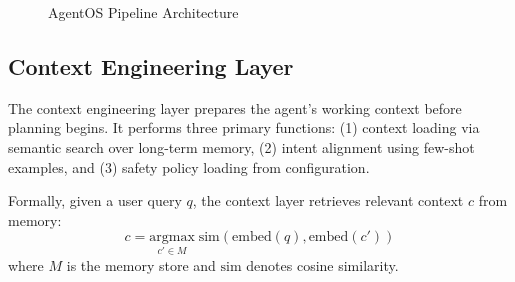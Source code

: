 \documentclass[11pt,a4paper]{article}
\begin{document}
\begin{figure}[htbp]
\centering
{}
\caption{AgentOS Pipeline Architecture}
\label{fig:architecture}
\end{figure}

\subsection{Context Engineering Layer}

The context engineering layer prepares the agent's working context before planning begins. It performs three primary functions: (1) context loading via semantic search over long-term memory, (2) intent alignment using few-shot examples, and (3) safety policy loading from configuration.

Formally, given a user query $q$, the context layer retrieves relevant context $c$ from memory:
\begin{equation}
c = \underset{c' \in M}{\text{argmax}} \; \text{sim}(\text{embed}(q), \text{embed}(c'))
\end{equation}
where $M$ is the memory store and $\text{sim}$ denotes cosine similarity.
\end{document}

